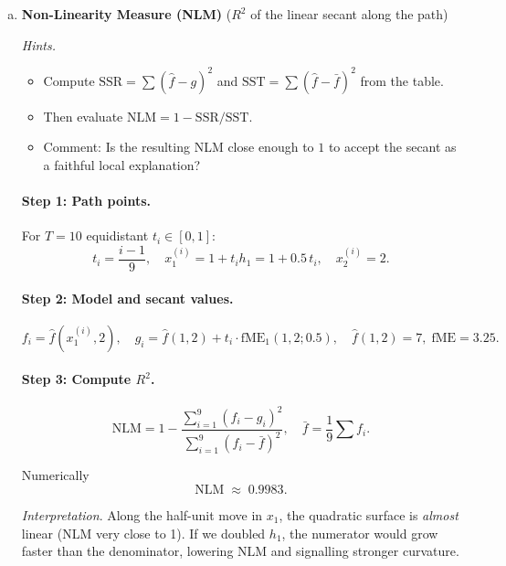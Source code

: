 {\begin{enumerate}[a)]
\emph{Why different?}  
The derivative \(6\) is the \emph{instantaneous} slope.  
The finite step of \(0.5\) exposes curvature; the quadratic term makes the
actual change only \(3.25\).  
Hence, using dME for a sizeable perturbation would greatly
over-predict the effect.

\item \textbf{Non-Linearity Measure (NLM)}  
(\(R^2\) of the linear secant along the path)

\textit{Hints.}
\begin{itemize}\setlength\itemsep{0.2em}
  \item Compute $\text{SSR}=\sum(\hat f - g)^2$ and
        $\text{SST}=\sum(\hat f -\bar f)^2$ from the table.
  \item Then evaluate $\mathrm{NLM}=1-\mathrm{SSR}/\mathrm{SST}$.
  \item Comment: Is the resulting NLM close enough to $1$ to accept the
        secant as a faithful local explanation?
\end{itemize}

\paragraph{Step 1: Path points.}  
For \(T=10\) equidistant \(t_i\in[0,1]\):
\[
  t_i=\frac{i-1}{9}, \quad
  x_1^{(i)} = 1 + t_i h_1 = 1+0.5\,t_i, \quad
  x_2^{(i)} = 2.
\]

\paragraph{Step 2: Model and secant values.}
\[
  f_i = \hat f(x_1^{(i)},2), 
  \quad
  g_i = \hat f(1,2) + t_i\cdot \text{fME}_1(1,2;0.5),
  \quad
  \hat f(1,2)=7,\;
  \text{fME}=3.25.
\]

\paragraph{Step 3: Compute \(R^2\).}
\[
  \text{NLM}=1-\frac{\sum_{i=1}^{9}(f_i-g_i)^2}%
                     {\sum_{i=1}^{9}(f_i-\bar f)^2},
  \quad
  \bar f=\frac1{9}\sum f_i.
\]

Numerically  
\[
  \boxed{\text{NLM}\;\approx\;0.9983}.
\]

\emph{Interpretation}.  
Along the half-unit move in \(x_1\), the quadratic surface is
\emph{almost} linear (NLM very close to 1).  
If we doubled \(h_1\), the numerator would grow faster than the denominator,
lowering NLM and signalling stronger curvature.

\end{enumerate}

}
